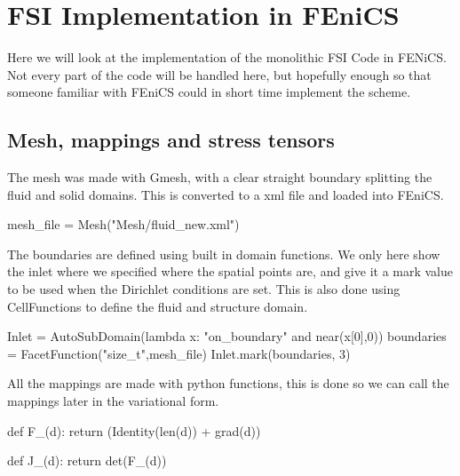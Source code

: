 \begin{comment}
\lstdefinelanguage{Python}{
 keywords={typeof, null, catch, switch, in, int, str, float, self},
 ndkeywords={boolean, throw, import},
 ndkeywords={return, class, if ,elif, endif, while, do, else, True, False , catch, def},
 ndkeywordstyle=\color{blue}\bfseries,
 identifierstyle=\color{black},
 sensitive=false,
 comment=[l]{\#},
 morecomment=[s]{/*}{*/},
 commentstyle=\color{purple}\ttfamily,
 stringstyle=\color{red}\ttfamily,
 backgroundcolor = \color{lightgray}
}
\end{comment}

\chapter{FSI Implementation in FEniCS}
Here we will look at the implementation of the monolithic FSI Code in FENiCS. Not every part of the code will be handled here, but hopefully enough so that someone familiar with FEniCS could in short time implement the scheme.


\section{Mesh, mappings and stress tensors}
The mesh was made with Gmesh, with a clear straight boundary splitting the fluid and solid domains. This is converted to a xml file and loaded into FEniCS. 

\begin{python}
mesh_file = Mesh("Mesh/fluid_new.xml")
\end{python}

The boundaries are defined using built in domain functions. We only here show the inlet where we specified where the spatial points are, and give it a mark value to be used when the Dirichlet conditions are set. This is also done using CellFunctions to define the fluid and structure domain. 

\begin{python}
Inlet = AutoSubDomain(lambda x: "on_boundary" and near(x[0],0))
boundaries = FacetFunction("size_t",mesh_file)
Inlet.mark(boundaries, 3)
\end{python}


All the mappings are made with python functions, this is done so we can call the mappings later in the variational form.

\begin{python}
def F_(d):
	return (Identity(len(d)) + grad(d))

def J_(d):
	return det(F_(d))
\end{python}

